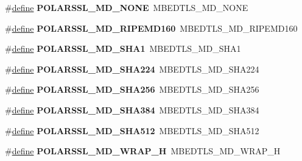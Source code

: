 \begin{DoxyCompactItemize}
\#\hyperlink{structdefine}{define} {\bfseries P\+O\+L\+A\+R\+S\+S\+L\+\_\+\+M\+D\+\_\+\+N\+O\+NE}~M\+B\+E\+D\+T\+L\+S\+\_\+\+M\+D\+\_\+\+N\+O\+NE
\item 
\mbox{\label{compat-1_83_8h_a402277cbaace94d95459054947ddd4b2}} 
\#\hyperlink{structdefine}{define} {\bfseries P\+O\+L\+A\+R\+S\+S\+L\+\_\+\+M\+D\+\_\+\+R\+I\+P\+E\+M\+D160}~M\+B\+E\+D\+T\+L\+S\+\_\+\+M\+D\+\_\+\+R\+I\+P\+E\+M\+D160
\item 
\mbox{\label{compat-1_83_8h_adebdb57871e95345175f019bcea37fe8}} 
\#\hyperlink{structdefine}{define} {\bfseries P\+O\+L\+A\+R\+S\+S\+L\+\_\+\+M\+D\+\_\+\+S\+H\+A1}~M\+B\+E\+D\+T\+L\+S\+\_\+\+M\+D\+\_\+\+S\+H\+A1
\item 
\mbox{\label{compat-1_83_8h_a1df0df45f4445de211514814d74bebd1}} 
\#\hyperlink{structdefine}{define} {\bfseries P\+O\+L\+A\+R\+S\+S\+L\+\_\+\+M\+D\+\_\+\+S\+H\+A224}~M\+B\+E\+D\+T\+L\+S\+\_\+\+M\+D\+\_\+\+S\+H\+A224
\item 
\mbox{\label{compat-1_83_8h_a4259233647a6e6070f9c7f42c805d633}} 
\#\hyperlink{structdefine}{define} {\bfseries P\+O\+L\+A\+R\+S\+S\+L\+\_\+\+M\+D\+\_\+\+S\+H\+A256}~M\+B\+E\+D\+T\+L\+S\+\_\+\+M\+D\+\_\+\+S\+H\+A256
\item 
\mbox{\label{compat-1_83_8h_a3a4c6db830d27c5a8b4963c70ceba149}} 
\#\hyperlink{structdefine}{define} {\bfseries P\+O\+L\+A\+R\+S\+S\+L\+\_\+\+M\+D\+\_\+\+S\+H\+A384}~M\+B\+E\+D\+T\+L\+S\+\_\+\+M\+D\+\_\+\+S\+H\+A384
\item 
\mbox{\label{compat-1_83_8h_a79fc05a8507a5e7dfbe2850e6349a6f4}} 
\#\hyperlink{structdefine}{define} {\bfseries P\+O\+L\+A\+R\+S\+S\+L\+\_\+\+M\+D\+\_\+\+S\+H\+A512}~M\+B\+E\+D\+T\+L\+S\+\_\+\+M\+D\+\_\+\+S\+H\+A512
\item 
\mbox{\label{compat-1_83_8h_a9add4ca06efa2f32f6bd79d0ee9130a6}} 
\#\hyperlink{structdefine}{define} {\bfseries P\+O\+L\+A\+R\+S\+S\+L\+\_\+\+M\+D\+\_\+\+W\+R\+A\+P\+\_\+H}~M\+B\+E\+D\+T\+L\+S\+\_\+\+M\+D\+\_\+\+W\+R\+A\+P\+\_\+H
\item 
\mbox{\label{compat-1_83_8h_ab0eba11408c8810b9116225bca801061}} 

\end{DoxyCompactItemize}
